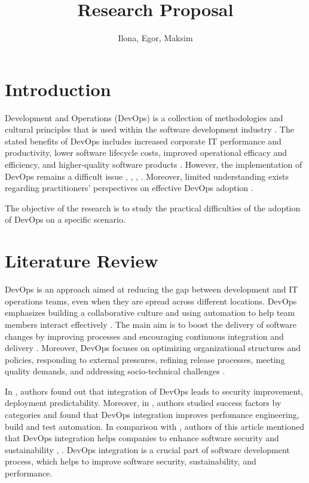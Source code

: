 \documentclass[oneside,final,12pt,a4paper]{extreport}
\title{Research Proposal}
\author{Ilona, Egor, Maksim}
\affil{Innopolis University}
\begin{document}
\maketitle

\newpage


\section{Introduction}

Development and Operations (DevOps) is a collection of methodologies and cultural principles that is used within the software development industry \cite{int1}. The stated benefits of DevOps includes increased corporate IT performance and productivity, lower software lifecycle costs, improved operational efficacy and efficiency, and higher-quality software products \cite{int1}. However, the implementation of DevOps remains a difficult issue \cite{int2}, \cite{8}, \cite{20}, \cite{14}. Moreover, limited understanding exists regarding practitioners' perspectives on effective DevOps adoption \cite{10}.

The objective of the research is to study the practical difficulties of the adoption of DevOps on a specific scenario.

\section{Literature Review}

DevOps is an approach aimed at reducing the gap between development and IT operations teams, even when they are spread across different locations. DevOps emphasizes building a collaborative culture and using automation to help team members interact effectively \cite{7}. The main aim is to boost the delivery of software changes by improving processes and encouraging continuous integration and delivery \cite{11}. Moreover, DevOps focuses on optimizing organizational structures and policies, responding to external pressures, refining release processes, meeting quality demands, and addressing socio-technical challenges \cite{7}.

In \cite{7}, authors found out that integration of DevOps leads to security improvement, deployment predictability. Moreover, in \cite{9}, authors studied success factors by categories and found that DevOps integration improves perfomance engineering, build and test automation. In comparison with \cite{9}, authors of this article mentioned that DevOps integration helps companies to enhance software security and sustainability \cite{12}, \cite{18}. DevOps integration is a crucial part of software development process, which helps to improve software security, sustainability, and performance.
\end{document}
